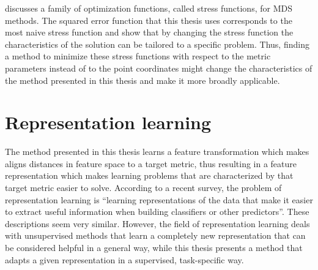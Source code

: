 \cite{chen2013stress} discusses a family of optimization functions, called stress functions, for \ac{MDS} methods. The squared error function that this thesis uses corresponds to the most naive stress function and \cite{chen2013stress} show that by changing the stress function the characteristics of the solution can be tailored to a specific problem. Thus, finding a method to minimize these stress functions with respect to the metric parameters instead of to the point coordinates might change the characteristics of the method presented in this thesis and make it more broadly applicable.



\section{Representation learning}

The method presented in this thesis learns a feature transformation which makes aligns distances in feature space to a target metric, thus resulting in a feature representation which makes learning problems that are characterized by that target metric easier to solve. According to a recent survey, the problem of representation learning is ``learning representations of the data that make it easier to extract useful information when building classiﬁers or other predictors''. \cite{bengio2013representation} These descriptions seem very similar. However, the field of representation learning deals with unsupervised methods that learn a completely new representation that can be considered helpful in a general way, while this thesis presents a method that adapts a given representation in a supervised, task-specific way.







